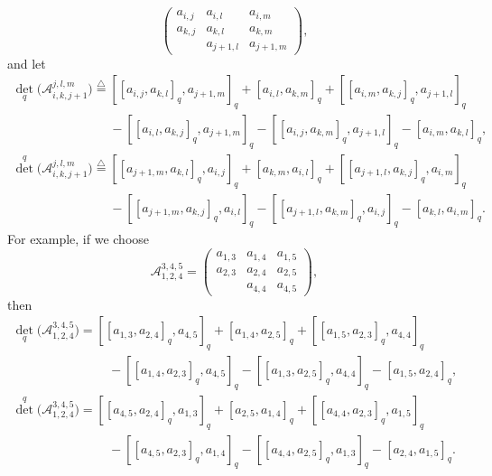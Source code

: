 \documentclass[10pt,a4paper]{amsart}
\numberwithin{equation}{section}
\def\A{\mathscr{A}}
\begin{document}
\begin{itemize}
\begin{equation}
\begin{pmatrix}
a_{i,j}& a_{i,l}& a_{i,m}\\
a_{k,j} & a_{k,l} & a_{k, m}\\
& a_{j+1,l} & a_{j+1,m }
 \end{pmatrix}
,
\end{equation}
and let
\begin{gather}
{\det}_q\bigl(\A_{i,k,j+1}^{j,l,m}\bigr)
 \overset{\bigtriangleup}{=} [ [a_{i, j}, a_{k, l} ]_q, a_{j+1, m} ]_q+ [a_{i,l},a_{k,m} ]_q+ [ [a_{i, m}, a_{k, j} ]_q, a_{j+1, l} ]_q \nonumber\\
\phantom{{\det}_q\bigl(\A_{i,k,j+1}^{j,l,m}\bigr)
 \overset{\bigtriangleup}{=}}{}
- [ [ a_{i, l }, a_{k,j} ]_q, a_{j+1, m} ]_q - [ [ a_{i, j}, a_{k, m} ]_q, a_{j+1, l} ]_q - [a_{i, m}, a_{k, l} ]_q, \label{eqn:D-1}\\
 {\det}^q\bigl(\A_{i,k,j+1}^{j,l,m}\bigr)
 \overset{\bigtriangleup}{=} [ [a_{j+1, m}, a_{k, l} ]_q, a_{i, j} ]_q+ [a_{k,m}, a_{i,l} ]_q + [ [a_{j+1, l}, a_{k, j} ]_q, a_{i, m} ]_q \nonumber\\
\phantom{ {\det}^q\bigl(\A_{i,k,j+1}^{j,l,m}\bigr)
 \overset{\bigtriangleup}{=}}{} - [ [ a_{j+1, m}, a_{k, j} ]_q, a_{i, l} ]_q - [ [a_{j+1, l}, a_{k, m} ]_q, a_{i, j} ]_q- [a_{k, l}, a_{i, m} ]_q. \label{eqn:D-2}
\end{gather}
For example, if we choose
\begin{equation*}
\A_{1,2,4}^{3,4,5}=
 \begin{pmatrix}
a_{1,3}& a_{1,4}& a_{1,5}\\
a_{2,3} & a_{2,4} & a_{2, 5}\\
& a_{4,4} & a_{4,5 }
 \end{pmatrix}
,
\end{equation*}
then
\begin{gather*}
 {\det}_q\bigl(\A_{1,2,4}^{3,4,5}\bigr)
= [ [a_{1, 3}, a_{2, 4} ]_q, a_{4, 5} ]_q+ [a_{1,4},a_{2,5} ]_q+ [ [a_{1, 5}, a_{2, 3} ]_q, a_{4, 4} ]_q \\
\phantom{ {\det}_q(\A_{1,2,4}^{3,4,5})
=}{}
- [ [ a_{1, 4 }, a_{2,3} ]_q, a_{4, 5} ]_q - [ [ a_{1, 3}, a_{2, 5} ]_q, a_{4, 4} ]_q - [a_{1, 5}, a_{2, 4} ]_q, \\
 {\det}^q\bigl(\A_{1,2,4}^{3,4,5}\bigr)
= [ [a_{4, 5}, a_{2, 4} ]_q, a_{1, 3} ]_q+ [a_{2,5}, a_{1,4} ]_q + [ [a_{4, 4}, a_{2, 3} ]_q, a_{1, 5} ]_q \\
 \phantom{ {\det}^q(\A_{1,2,4}^{3,4,5})
= }{}- [ [ a_{4, 5}, a_{2, 3} ]_q, a_{1, 4} ]_q - [ [a_{4, 4}, a_{2, 5} ]_q, a_{1, 3} ]_q- [a_{2, 4}, a_{1, 5} ]_q.
\end{gather*}
\end{itemize}
\end{document}
